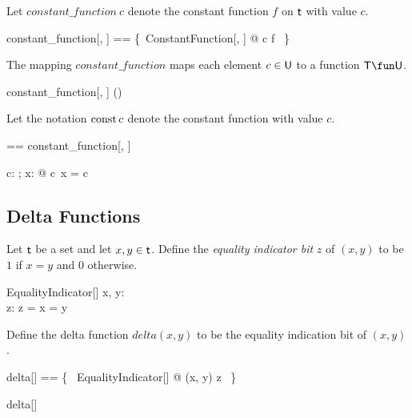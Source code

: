 \documentclass{amsart}
\begin{document}
Let $constant\_function~c$ denote the constant function $f$ on $\mathsf{t}$ with value $c$.

\begin{zed}
	constant\_function[\genT, \genU] == \{~ConstantFunction[\genT, \genU] @ c \mapsto f ~\}
\end{zed}

\begin{remark}
The mapping $constant\_function$ maps each element $c \in \mathsf{U}$ to a function $\setT \fun \setU$.
\begin{zed}
	constant\_function[\setT, \setU] \in \setU \fun (\setT \fun \setU)
\end{zed}
\end{remark}

Let the notation $\operatorname{const} c$ denote the constant function with value $c$.

\begin{zed}
	\const[\genT, \genU] == constant\_function[\genT, \genU]
\end{zed}

\begin{remark}
\begin{zed}
	\forall c: \setU; x: \setT @ \const[\setT, \setU] c~x = c
\end{zed}
\end{remark}

\subsection{Delta Functions}

Let $\mathsf{t}$ be a set and let $x, y \in \mathsf{t}$. 
Define the \textit{equality indicator bit} $z$ of $(x, y)$ to be $1$ if $x = y$ and $0$ otherwise.

\begin{schema}{EqualityIndicator}[\genT]
	x, y: \genT \\
	z: \B
\where
	z = \IF x = y  
\end{schema}

Define the delta function $delta(x, y)$ to be the equality indication bit of $(x, y)$.

\begin{zed}
	delta[\genT] == \{~ EqualityIndicator[\genT] @ (x, y) \mapsto z ~\}
\end{zed}

\begin{remark}
\begin{zed}
	delta[\setX] \in \setX \cross \setX \fun \B
\end{zed}
\end{remark}
\end{document}
